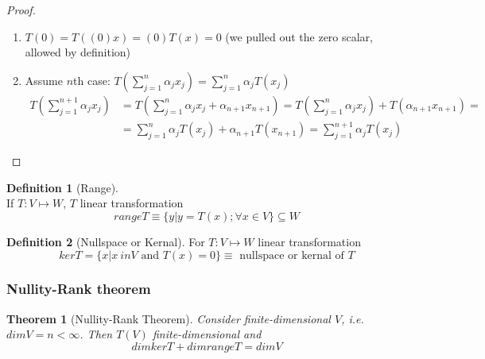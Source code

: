 \documentclass[twoside]{amsart}
\theoremstyle{plain}
\newtheorem{theorem}{Theorem}
\theoremstyle{definition}
\newtheorem{definition}{Definition}
\begin{document}
\begin{proof} \quad \\
  \begin{enumerate}
  \item $T(0) = T((0)x) = (0)T(x) = 0 $ (we pulled out the zero scalar, allowed by definition) 
  \item Assume $n$th case: $T(\sum_{j=1}^{n} \alpha_j x_j ) = \sum_{j=1}^n \alpha_j T(x_j)$
\begin{align*}
T(\sum_{j=1}^{n+1} \alpha_j x_j ) & = T(\sum_{j=1}^{n} \alpha_j x_j + \alpha_{n+1} x_{n+1}) = T(\sum_{j=1}^{n} \alpha_j x_j) + T(\alpha_{n+1}x_{n+1}) =  \\ 
 &= \sum_{j=1}^n \alpha_j T(x_j) + \alpha_{n+1}T(x_{n+1}) = \sum_{j=1}^{n+1} \alpha_{j} T(x_j) 
\end{align*}    
  \end{enumerate}
\end{proof}

\begin{definition}[Range] \quad \\
If $T:V \mapsto W$, $T$ linear transformation
\[
range T \equiv \{ y | y=T(x); \forall x \in V  \} \subseteq W
\]
\end{definition}

\begin{definition}[Nullspace or Kernal]
For $T:V \mapsto W$ linear transformation
\begin{equation}
ker T = \{ x | x \ in V \text{ and } T(x) =0 \} \equiv \text{ nullspace or kernal of } T
\end{equation}
\end{definition}


\subsubsection{Nullity-Rank theorem}\label{subsubS:Nullity-Rank}

\begin{theorem}[Nullity-Rank Theorem]\label{T:Nullity-Rank_Theorem}
Consider finite-dimensional $V$, i.e. $dim V = n < \infty$.  Then $T(V)$ finite-dimensional and  
\begin{equation}
dim ker T + dim range T = dim V
\end{equation}
\end{theorem}
\end{document}

